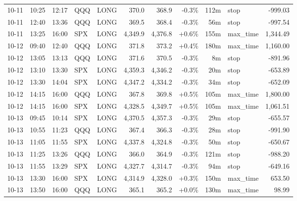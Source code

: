 \documentclass[11pt,a4paper,twoside]{article}
\begin{document}
\begin{center}
\begin{longtable}{>{\color{txtmain}}l l l l l r r r r >{\color{txtmain}}l r}
10-11 & 10:25 & 12:17 & QQQ & LONG & 370.0 & 368.9 & \textcolor{lossred}{-0.3\%} & 112m & stop & \textcolor{lossred}{-999.03} \\
10-11 & 12:40 & 13:36 & QQQ & LONG & 369.5 & 368.4 & \textcolor{lossred}{-0.3\%} & 56m & stop & \textcolor{lossred}{-997.54} \\
10-11 & 13:25 & 16:00 & SPX & LONG & 4,349.9 & 4,376.8 & \textcolor{wingreen}{+0.6\%} & 155m & max\_time & \textcolor{wingreen}{1,344.49} \\
10-12 & 09:40 & 12:40 & QQQ & LONG & 371.8 & 373.2 & \textcolor{wingreen}{+0.4\%} & 180m & max\_time & \textcolor{wingreen}{1,160.00} \\
10-12 & 13:05 & 13:13 & QQQ & LONG & 371.6 & 370.5 & \textcolor{lossred}{-0.3\%} & 8m & stop & \textcolor{lossred}{-891.96} \\
10-12 & 13:10 & 13:30 & SPX & LONG & 4,359.3 & 4,346.2 & \textcolor{lossred}{-0.3\%} & 20m & stop & \textcolor{lossred}{-653.89} \\
10-12 & 13:30 & 14:04 & SPX & LONG & 4,347.2 & 4,334.2 & \textcolor{lossred}{-0.3\%} & 34m & stop & \textcolor{lossred}{-652.09} \\
10-12 & 14:15 & 16:00 & QQQ & LONG & 367.8 & 369.8 & \textcolor{wingreen}{+0.5\%} & 105m & max\_time & \textcolor{wingreen}{1,800.00} \\
10-12 & 14:15 & 16:00 & SPX & LONG & 4,328.5 & 4,349.7 & \textcolor{wingreen}{+0.5\%} & 105m & max\_time & \textcolor{wingreen}{1,061.51} \\
10-13 & 09:45 & 10:14 & SPX & LONG & 4,370.5 & 4,357.3 & \textcolor{lossred}{-0.3\%} & 29m & stop & \textcolor{lossred}{-655.57} \\
10-13 & 10:55 & 11:23 & QQQ & LONG & 367.4 & 366.3 & \textcolor{lossred}{-0.3\%} & 28m & stop & \textcolor{lossred}{-991.90} \\
10-13 & 11:05 & 11:55 & SPX & LONG & 4,337.8 & 4,324.8 & \textcolor{lossred}{-0.3\%} & 50m & stop & \textcolor{lossred}{-650.67} \\
10-13 & 11:25 & 13:26 & QQQ & LONG & 366.0 & 364.9 & \textcolor{lossred}{-0.3\%} & 121m & stop & \textcolor{lossred}{-988.20} \\
10-13 & 11:55 & 13:29 & SPX & LONG & 4,327.7 & 4,314.7 & \textcolor{lossred}{-0.3\%} & 94m & stop & \textcolor{lossred}{-649.16} \\
10-13 & 13:30 & 16:00 & SPX & LONG & 4,314.9 & 4,328.0 & \textcolor{wingreen}{+0.3\%} & 150m & max\_time & \textcolor{wingreen}{653.50} \\
10-13 & 13:50 & 16:00 & QQQ & LONG & 365.1 & 365.2 & \textcolor{wingreen}{+0.0\%} & 130m & max\_time & \textcolor{wingreen}{98.99} \\

\end{longtable}
\end{center}
\end{document}
